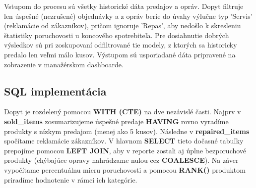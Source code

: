 \documentclass[11pt, a4paper]{article}
\begin{document}
Vstupom do procesu sú všetky historické dáta predajov a opráv. Dopyt filtruje len úspešné (nezrušené) objednávky a z opráv berie do úvahy výlučne typ 'Servis' (reklamácie od zákazníkov), pričom ignoruje 'Repas', aby nedošlo k skresleniu štatistiky poruchovosti u koncového spotrebiteľa. Pre dosiahnutie dobrých výsledkov sú pri zoskupovaní odfiltrované tie modely, z ktorých sa historicky predalo len veľmi málo kusov. Výstupom sú usporiadané dáta pripravené na zobrazenie v manažérskom dashboarde.

\subsection{SQL implementácia}
Dopyt je rozdelený pomocou \textbf{WITH (CTE)} na dve nezávislé časti. Najprv v \textbf{sold\_items} zosumarizujeme úspešné predaje \textbf{HAVING} rovno vyradíme produkty s nízkym predajom (menej ako 5 kusov). Následne v \textbf{repaired\_items} spočítame reklamácie zákazníkov. V hlavnom \textbf{SELECT} tieto dočasné tabuľky prepojíme pomocou \textbf{LEFT JOIN}, aby v reporte zostali aj úplne bezporuchové produkty (chýbajúce opravy nahrádzame nulou cez \textbf{COALESCE}). Na záver vypočítame percentuálnu mieru poruchovosti a pomocou \textbf{RANK()} produktom priradíme hodnotenie v rámci ich kategórie.
\end{document}
